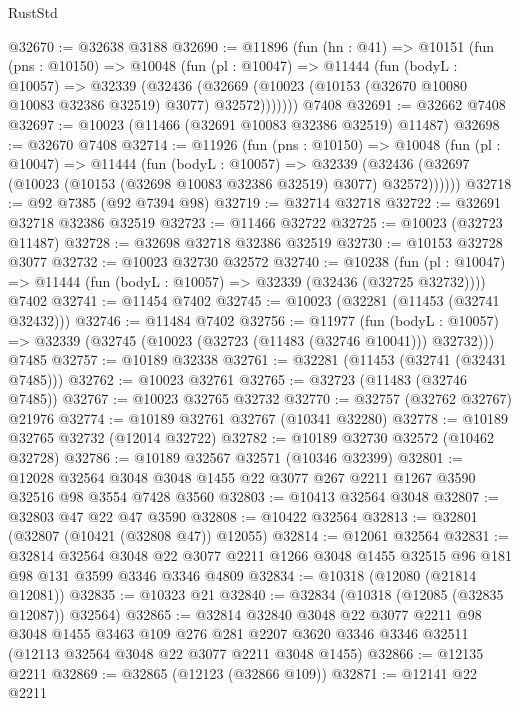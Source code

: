 \begin{lexlean}{RustStd}
\begin{coremodule}
@32670 := @32638 @3188
@32690 := @11896
    (fun (hn : @41) =>
    @10151
      (fun (pns : @10150) =>
      @10048
        (fun (pl : @10047) =>
        @11444
          (fun (bodyL : @10057) =>
          @32339
            (@32436
              (@32669 (@10023 (@10153 (@32670 @10080 @10083 @32386 @32519) @3077) @32572)))))))
    @7408
@32691 := @32662 @7408
@32697 := @10023 (@11466 (@32691 @10083 @32386 @32519) @11487)
@32698 := @32670 @7408
@32714 := @11926
    (fun (pns : @10150) =>
    @10048
      (fun (pl : @10047) =>
      @11444
        (fun (bodyL : @10057) =>
        @32339 (@32436 (@32697 (@10023 (@10153 (@32698 @10083 @32386 @32519) @3077) @32572))))))
@32718 := @92 @7385 (@92 @7394 @98)
@32719 := @32714 @32718
@32722 := @32691 @32718 @32386 @32519
@32723 := @11466 @32722
@32725 := @10023 (@32723 @11487)
@32728 := @32698 @32718 @32386 @32519
@32730 := @10153 @32728 @3077
@32732 := @10023 @32730 @32572
@32740 := @10238
    (fun (pl : @10047) => @11444 (fun (bodyL : @10057) => @32339 (@32436 (@32725 @32732))))
    @7402
@32741 := @11454 @7402
@32745 := @10023 (@32281 (@11453 (@32741 @32432)))
@32746 := @11484 @7402
@32756 := @11977
    (fun (bodyL : @10057) => @32339 (@32745 (@10023 (@32723 (@11483 (@32746 @10041))) @32732)))
    @7485
@32757 := @10189 @32338
@32761 := @32281 (@11453 (@32741 (@32431 @7485)))
@32762 := @10023 @32761
@32765 := @32723 (@11483 (@32746 @7485))
@32767 := @10023 @32765 @32732
@32770 := @32757 (@32762 @32767) @21976
@32774 := @10189 @32761 @32767 (@10341 @32280)
@32778 := @10189 @32765 @32732 (@12014 @32722)
@32782 := @10189 @32730 @32572 (@10462 @32728)
@32786 := @10189 @32567 @32571 (@10346 @32399)
@32801 := @12028
    @32564
    @3048
    @3048
    @1455
    @22
    @3077
    @267
    @2211
    @1267
    @3590
    @32516
    @98
    @3554
    @7428
    @3560
@32803 := @10413 @32564 @3048
@32807 := @32803 @47 @22 @47 @3590
@32808 := @10422 @32564
@32813 := @32801 (@32807 (@10421 (@32808 @47)) @12055)
@32814 := @12061 @32564
@32831 := @32814
    @32564
    @3048
    @22
    @3077
    @2211
    @1266
    @3048
    @1455
    @32515
    @96
    @181
    @98
    @131
    @3599
    @3346
    @3346
    @4809
@32834 := @10318 (@12080 (@21814 @12081))
@32835 := @10323 @21
@32840 := @32834 (@10318 (@12085 (@32835 @12087)) @32564)
@32865 := @32814
    @32840
    @3048
    @22
    @3077
    @2211
    @98
    @3048
    @1455
    @3463
    @109
    @276
    @281
    @2207
    @3620
    @3346
    @3346
    @32511
    (@12113 @32564 @3048 @22 @3077 @2211 @3048 @1455)
@32866 := @12135 @2211
@32869 := @32865 (@12123 (@32866 @109))
@32871 := @12141 @22 @2211

\end{coremodule}
\end{lexlean}
